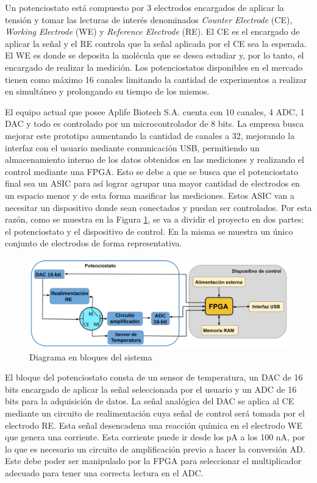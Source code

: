 \documentclass[11pt]{charter}
\begin{document}
Un potenciostato está compuesto por 3 electrodos encargados de aplicar la tensión y tomar las lecturas de interés denominados \textit{Counter Electrode} (CE), \textit{Working Electrode} (WE) y \textit{Reference Electrode} (RE). El CE es el encargado de aplicar la señal y el RE controla que la señal aplicada por el CE sea la esperada. El WE es donde se deposita la molécula que se desea estudiar y, por lo tanto, el encargado de realizar la medición. Los potenciostatos disponibles en el mercado tienen como máximo 16  canales limitando la cantidad de experimentos a realizar en simultáneo y prolongando su tiempo de los mismos. 

El equipo actual que posee Aplife Biotech S.A. cuenta con 10 canales, 4 ADC, 1 DAC y todo es controlado por un microcontrolador de 8 bits. La empresa busca mejorar este prototipo aumentando la cantidad de canales a 32, mejorando la interfaz con el usuario mediante comunicación USB, permitiendo un almacenamiento interno de los datos obtenidos en las mediciones y realizando el control mediante una FPGA. Esto se debe a que se busca que el potenciostato final sea un ASIC para así lograr agrupar una mayor cantidad de electrodos en un espacio menor y de esta forma masificar las mediciones. Estos ASIC van a necesitar un dispositivo donde sean conectados y puedan ser controlados. Por esta razón, como se muestra en la Figura \ref{fig:diagBloques}, se va a dividir el proyecto en dos partes: el potenciostato y el dispositivo de control. En la misma se muestra un único conjunto de electrodos de forma representativa.

\begin{figure}[!ht]
\centering 
\includegraphics[width=1\textwidth]{./Figuras/diagrama_bloques.png}
\caption{Diagrama en bloques del sistema}
\label{fig:diagBloques}
\end{figure}

El bloque del potenciostato consta de un sensor de temperatura, un DAC de 16 bits encargado de aplicar la señal seleccionada por el usuario y un ADC de 16 bits para la adquisición de datos. La señal analógica del DAC se aplica al CE mediante un circuito de realimentación cuya señal de control será tomada por el electrodo RE. Esta señal desencadena una reacción química en el electrodo WE que genera una corriente. Esta corriente puede ir desde los pA a los 100 nA, por lo que es necesario un circuito de amplificación previo a hacer la conversión AD. Este debe poder ser manipulado por la FPGA para seleccionar el multiplicador adecuado para tener una correcta lectura en el ADC.
 
\end{document}

